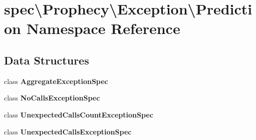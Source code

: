 \section{spec\textbackslash{}Prophecy\textbackslash{}Exception\textbackslash{}Prediction Namespace Reference}
\label{namespacespec_1_1_prophecy_1_1_exception_1_1_prediction}
\subsection*{Data Structures}
\begin{DoxyCompactItemize}
\item 
class {\bf Aggregate\+Exception\+Spec}
\item 
class {\bf No\+Calls\+Exception\+Spec}
\item 
class {\bf Unexpected\+Calls\+Count\+Exception\+Spec}
\item 
class {\bf Unexpected\+Calls\+Exception\+Spec}
\end{DoxyCompactItemize}
